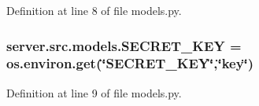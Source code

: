 Definition at line 8 of file models.\+py.

\subsubsection[{\texorpdfstring{S\+E\+C\+R\+E\+T\+\_\+\+K\+EY}{SECRET_KEY}}]{\setlength{\rightskip}{0pt plus 5cm}server.\+src.\+models.\+S\+E\+C\+R\+E\+T\+\_\+\+K\+EY = os.\+environ.\+get(\char`\"{}S\+E\+C\+R\+E\+T\+\_\+\+K\+EY\char`\"{},\char`\"{}key\char`\"{})}\hypertarget{namespaceserver_1_1src_1_1models_aab444ae0b57d9be125bb8e6868a65c75}{}\label{namespaceserver_1_1src_1_1models_aab444ae0b57d9be125bb8e6868a65c75}


Definition at line 9 of file models.\+py.


